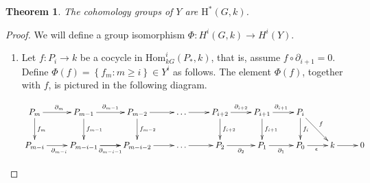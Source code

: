 \documentclass[12pt]{article}
\newtheorem{theorem}[definition]{Theorem}
\begin{document}
\begin{theorem}
The cohomology groups of $Y$ are $\mathrm{H}^\ast\left(G,k\right)$.
\end{theorem}
\begin{proof}
We will define a group isomorphism
$\Phi:H^i\left(G,k\right)\to H^i\left(Y\right)$.
\begin{enumerate}
\item Let $f:P_i\to k$ be a cocycle
in $\mathrm{Hom}_{kG}^i\left(P_\ast,k\right)$,
that is, assume $f\circ\partial_{i+1}=0$.
Define $\Phi\left(f\right)=
\left\{f_m:m\ge i\right\}\in Y^i$ as follows.
The element $\Phi\left(f\right)$, together with $f$, is pictured
in the following diagram.

\begin{equation}\label{pff}\xymatrix{
P_m\ar[r]^{\partial_m}\ar[d]^{f_m}
&P_{m-1}\ar[d]^{f_{m-1}}\ar[r]^{\partial_{m-1}}
&P_{m-2}\ar[d]^{f_{m-2}}\ar[r]
&\dots\ar[r]
&P_{i+2}\ar[r]^{\partial_{i+2}}\ar[d]^{f_{i+2}}
&P_{i+1}\ar[r]^{\partial_{i+1}}\ar[d]^{f_{i+1}}
&P_i\ar[d]^{f_i}\ar[dr]^f
\\
P_{m-i}\ar[r]_{\partial_{m-i}}
&P_{m-i-1}\ar[r]\ar[r]_{\partial_{m-i-1}}
&P_{m-i-2}\ar[r]
&\dots\ar[r]
&P_2\ar[r]_{\partial_2}
&P_1\ar[r]_{\partial_1}
&P_0\ar[r]_\epsilon&k\ar[r]&0
}\end{equation}


\end{enumerate}
\end{proof}
\end{document}
